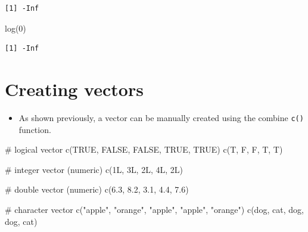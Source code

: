 \documentclass[
  letterpaper,
  DIV=11,
  numbers=noendperiod]{scrreprt}
\newenvironment{Shaded}{\begin{snugshade}}{\end{snugshade}}
\newcommand{\CommentTok}[1]{\textcolor[rgb]{0.37,0.37,0.37}{#1}}
\newcommand{\ConstantTok}[1]{\textcolor[rgb]{0.56,0.35,0.01}{#1}}
\newcommand{\DecValTok}[1]{\textcolor[rgb]{0.68,0.00,0.00}{#1}}
\newcommand{\FloatTok}[1]{\textcolor[rgb]{0.68,0.00,0.00}{#1}}
\newcommand{\FunctionTok}[1]{\textcolor[rgb]{0.28,0.35,0.67}{#1}}
\newcommand{\NormalTok}[1]{\textcolor[rgb]{0.00,0.23,0.31}{#1}}
\newcommand{\StringTok}[1]{\textcolor[rgb]{0.13,0.47,0.30}{#1}}
\providecommand{\tightlist}{%
  \setlength{\itemsep}{0pt}\setlength{\parskip}{0pt}}\usepackage{longtable,booktabs,array}
\begin{document}
\begin{tcolorbox}
\begin{verbatim}
[1] -Inf
\end{verbatim}

\begin{Shaded}
\begin{Highlighting}[]
\FunctionTok{log}\NormalTok{(}\DecValTok{0}\NormalTok{)}
\end{Highlighting}
\end{Shaded}

\begin{verbatim}
[1] -Inf
\end{verbatim}

\end{tcolorbox}

\section{Creating vectors}\label{creating-vectors}

\begin{itemize}
\tightlist
\item
  As shown previously, a vector can be manually created using the
  combine \texttt{c()} function.
\end{itemize}

\begin{Shaded}
\begin{Highlighting}[]
\CommentTok{\# logical vector}
\FunctionTok{c}\NormalTok{(}\ConstantTok{TRUE}\NormalTok{, }\ConstantTok{FALSE}\NormalTok{, }\ConstantTok{FALSE}\NormalTok{, }\ConstantTok{TRUE}\NormalTok{, }\ConstantTok{TRUE}\NormalTok{)}
\FunctionTok{c}\NormalTok{(T, F, F, T, T)}

\CommentTok{\# integer vector (numeric)}
\FunctionTok{c}\NormalTok{(}\DecValTok{1}\NormalTok{L, }\DecValTok{3}\NormalTok{L, }\DecValTok{2}\NormalTok{L, }\DecValTok{4}\NormalTok{L, }\DecValTok{2}\NormalTok{L)}

\CommentTok{\# double vector (numeric)}
\FunctionTok{c}\NormalTok{(}\FloatTok{6.3}\NormalTok{, }\FloatTok{8.2}\NormalTok{, }\FloatTok{3.1}\NormalTok{, }\FloatTok{4.4}\NormalTok{, }\FloatTok{7.6}\NormalTok{)}

\CommentTok{\# character vector}
\FunctionTok{c}\NormalTok{(}\StringTok{"apple"}\NormalTok{, }\StringTok{"orange"}\NormalTok{, }\StringTok{"apple"}\NormalTok{, }\StringTok{"apple"}\NormalTok{, }\StringTok{"orange"}\NormalTok{)  }
\FunctionTok{c}\NormalTok{(}\StringTok{\textquotesingle{}dog\textquotesingle{}}\NormalTok{, }\StringTok{\textquotesingle{}cat\textquotesingle{}}\NormalTok{, }\StringTok{\textquotesingle{}dog\textquotesingle{}}\NormalTok{, }\StringTok{\textquotesingle{}dog\textquotesingle{}}\NormalTok{, }\StringTok{\textquotesingle{}cat\textquotesingle{}}\NormalTok{) }
\end{Highlighting}
\end{Shaded}
\end{document}
